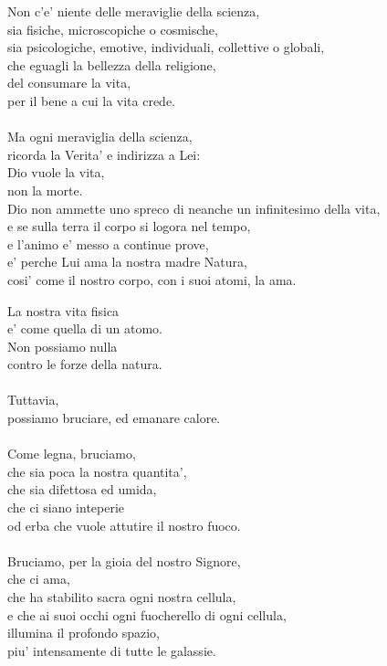 \begin{haiku}
    Non c'e' niente delle meraviglie della scienza,\\
    sia fisiche, microscopiche o cosmische,\\
    sia psicologiche, emotive, individuali, collettive o globali,\\
    che eguagli la bellezza della religione,\\
    del consumare la vita,\\
    per il bene a cui la vita crede.\\
    \leavevmode\\
    Ma ogni meraviglia della scienza,\\
    ricorda la Verita' e indirizza a Lei:\\
    Dio vuole la vita,\\
    non la morte.\\
    Dio non ammette uno spreco di neanche un infinitesimo della vita,\\
    e se sulla terra il corpo si logora nel tempo,\\
    e l'animo e' messo a continue prove,\\
    e' perche Lui ama la nostra madre Natura,\\
    cosi' come il nostro corpo, con i suoi atomi, la ama.\\
\end{haiku}


\begin{haiku}
    \label{bruciamoComeLegna}
    La nostra vita fisica \\
    e' come quella di un atomo.\\
    Non possiamo nulla\\
    contro le forze della natura.\\
    \leavevmode\\
    Tuttavia,\\
    possiamo bruciare, ed emanare calore.\\
    \leavevmode\\
    Come legna, bruciamo,\\
    che sia poca la nostra quantita',\\
    che sia difettosa ed umida,\\
    che ci siano inteperie\\
    od erba che vuole attutire il nostro fuoco.\\
    \leavevmode\\
    Bruciamo, per la gioia del nostro Signore,\\
    che ci ama,\\
    che ha stabilito sacra ogni nostra cellula,\\
    e che ai suoi occhi ogni fuocherello di ogni cellula,\\
    illumina il profondo spazio,\\
    piu' intensamente di tutte le galassie.\\
\end{haiku}
